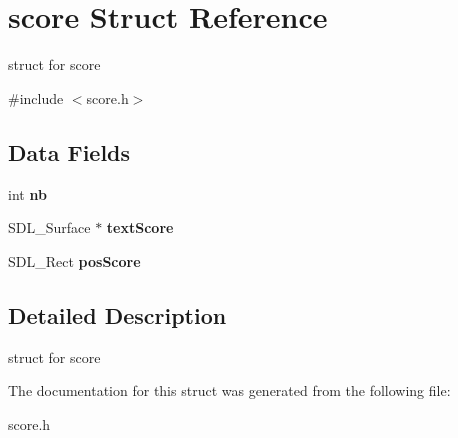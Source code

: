 \hypertarget{structscore}{}\section{score Struct Reference}
\label{structscore}


struct for score  




{\ttfamily \#include $<$score.\+h$>$}

\subsection*{Data Fields}
\begin{DoxyCompactItemize}
\item 
\mbox{\label{structscore_a2c1759dbbf8b3b6e8c7d3f13b4e559fa}} 
int {\bfseries nb}
\item 
\mbox{\label{structscore_a4e613f20c6a9d450aecf72f0a0d827d1}} 
S\+D\+L\+\_\+\+Surface $\ast$ {\bfseries text\+Score}
\item 
\mbox{\label{structscore_a734e38cad2ceb3ff0fbc1651fc7df861}} 
S\+D\+L\+\_\+\+Rect {\bfseries pos\+Score}
\end{DoxyCompactItemize}


\subsection{Detailed Description}
struct for score 

The documentation for this struct was generated from the following file\+:\begin{DoxyCompactItemize}
\item 
score.\+h\end{DoxyCompactItemize}
